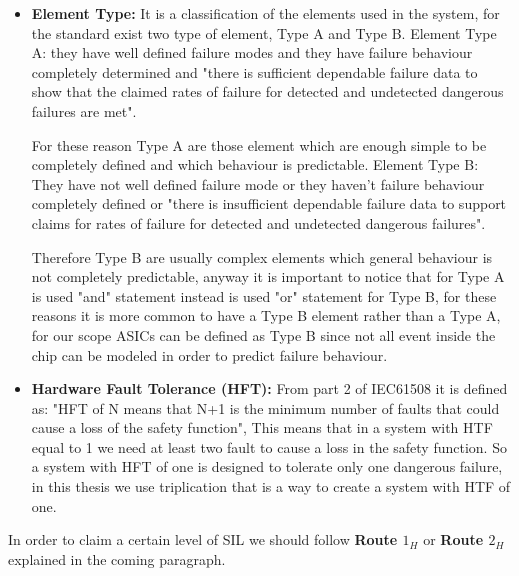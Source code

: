 {{{{\begin{itemize}
		            Instead "average failure rates of safe plus dangerous detected failures" are the overall number of failure injected that don't cause an error in the output of the stage. For these reason in this thesis:
		            \[ SFF = 1 - \frac{\text{Errors at the output of our stage}}{\text{Total injected error}}\]
		            \item \textbf{Element Type:} It is a classification of the elements used in the system, for the standard exist two type of element, Type A and Type B. Element Type A: they have well defined failure modes and they have failure behaviour completely determined and "there is sufficient dependable failure data to show that the claimed rates of failure for detected and undetected dangerous failures are met". 
		            
		            
		            For these reason Type A are those element which are enough simple to be completely defined and which behaviour is predictable. 
		            Element Type B: They have not well defined failure mode or they haven't failure behaviour completely defined or "there is insufficient dependable failure data to support claims for rates of failure for detected and undetected dangerous failures". 
		            
		            
		            Therefore Type B are usually complex elements which general behaviour is not completely predictable, anyway it is important to notice that for Type A is used "and" statement instead is used "or" statement for Type B, for these reasons it is more common to have a Type B element rather than a Type A, for our scope ASICs can be defined as Type B since not all event inside the chip can be modeled in order to predict failure behaviour.
		            \item \textbf{Hardware Fault Tolerance (HFT):} From part 2 of IEC61508 it is defined as: "HFT of N means that N+1 is the minimum number of faults that could cause a loss of the safety function", This means that in a system with HTF equal to 1  we need at least two fault to cause a loss in the safety function. So a system with HFT of one is designed to tolerate only one dangerous failure, in this thesis we use triplication that is a way to create a system with HTF of one.
		        \end{itemize}
		        
		        
		        In order to claim a certain level of SIL we should follow \textbf{Route $1_H$} or \textbf{Route $2_H$} explained in the coming paragraph.
}}}}
